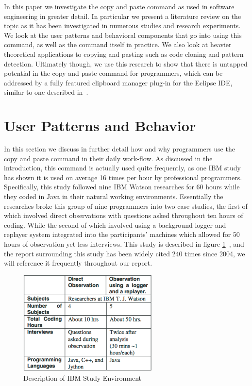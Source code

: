 \documentclass{acm_proc_article-sp}
\begin{document}
In this paper we investigate the copy and paste command as used in software engineering in greater detail. In particular we present a literature review on the topic as it has been investigated in numerous studies and research experiments. We look at the user patterns and behavioral components that go into using this command, as well as the command itself in practice. We also look at heavier theoretical applications to copying and pasting such as code cloning and pattern detection. Ultimately though, we use this research to show that there is untapped potential in the copy and paste command for programmers, which can be addressed by a fully featured clipboard manager plug-in for the Eclipse IDE, similar to one described in~\cite{ooplCP}.

\section{User Patterns and Behavior}\label{sec:patterns}

In this section we discuss in further detail how and why programmers use the copy and paste command in their daily work-flow. As discussed in the introduction, this command is actually used quite frequently, as one IBM study has shown it is used on average 16 times per hour by professional programmers. Specifically, this study followed nine IBM Watson researches for 60 hours while they coded in Java in their natural working environments. Essentially the researches broke this group of nine programmers into two case studies, the first of which involved direct observations with questions asked throughout ten hours of coding. While the second of which involved using a background logger and replayer system integrated into the participants' machines which allowed for 50 hours of observation yet less interviews. This study is described in figure \ref{fig:oopl}~\cite{ooplCP}, and the report surrounding this study has been widely cited 240 times since 2004, we will reference it frequently throughout our report.

\begin{figure}[h]
\centering
\includegraphics[width=7cm]{ooplStudy}
\caption{Description of IBM Study Environment}
\label{fig:oopl}
\end{figure}
\end{document}
